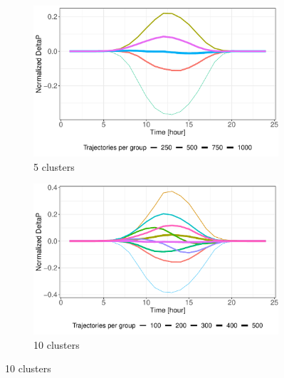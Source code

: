 \documentclass[12pt]{report}
\begin{document}
\begin{figure}[h] 
	\begin{subfigure}[b]{0.5\linewidth}
		\centering
		\includegraphics[width=0.9\linewidth]{Images/PV/Kmeans/Kmeans5Clusts.pdf} 
		\caption{5 clusters} 
	\end{subfigure}%
	\begin{subfigure}[b]{0.5\linewidth}
		\centering
		\includegraphics[width=0.9\linewidth]{Images/PV/Kmeans/Kmeans10Clusts.pdf} 
		\caption{10 clusters} 
	\end{subfigure}
	

\end{figure}
\end{document}
